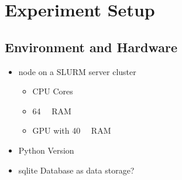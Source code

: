 \chapter{Experiment Setup}
\label{sec:experiment_setup}


\section{Environment and Hardware}
\label{sec:experiment_setup:environment_hardware}

\begin{itemize}
  \item node on a SLURM server cluster
        \begin{itemize}
          \item CPU Cores
          \item \SI{64}{\giga\byte} RAM
          \item GPU with \SI{40}{\giga\byte} RAM
        \end{itemize}
  \item Python Version
  \item sqlite Database as data storage?
\end{itemize}